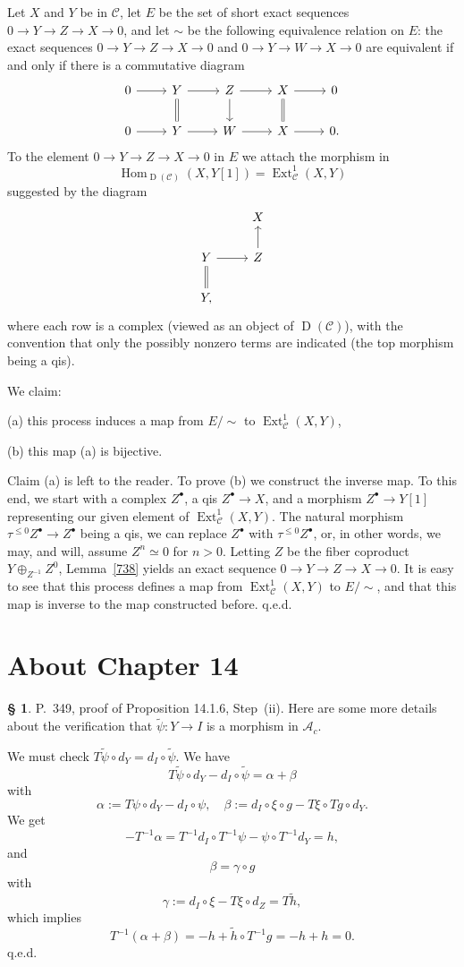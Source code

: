 \documentclass[12pt]{article}%
\theoremstyle{remark}
\theoremstyle{definition}
\newtheorem{s}[thm]{\S}%
\newcommand{\oo}{\operatorname}
\newcommand{\A}{\mathcal A}
\newcommand{\C}{\mathcal C}
\DeclareMathOperator{\Hom}{Hom}%
\begin{document}
Let $X$ and $Y$ be in $\C$, let $E$ be the set of short exact sequences $0\to Y\to Z\to X\to0$, and let $\sim$ be the following equivalence relation on $E$: the exact sequences $0\to Y\to Z\to X\to0$ and $0\to Y\to W\to X\to0$ are equivalent if and only if there is a commutative diagram 
$$
\begin{tikzcd}
0\ar{r}&Y\ar[equal]{d}\ar{r}&Z\ar{d}\ar{r}&X\ar[equal]{d}\ar{r}&0\\ 
0\ar{r}&Y\ar{r}&W\ar{r}&X\ar{r}&0.
\end{tikzcd}
$$ 
To the element $0\to Y\to Z\to X\to0$ in $E$ we attach the morphism in 
$$
\Hom_{\oo D(\C)}(X,Y[1])=\oo{Ext}^1_\C(X,Y)
$$ 
suggested by the diagram 
$$
\begin{tikzcd}
{}&X\\ 
Y\ar[equal]{d}\ar{r}&Z\ar{u}\\ 
Y,
\end{tikzcd}
$$ 
where each row is a complex (viewed as an object of $\oo D(\C)$), with the convention that only the possibly nonzero terms are indicated (the top morphism being a qis). 

We claim: 

(a) this process induces a map from $E/\!\!\sim$ to $\oo{Ext}^1_\C(X,Y)$, 

(b) this map (a) is bijective. 

Claim (a) is left to the reader. To prove (b) we construct the inverse map. To this end, we start with a complex $Z^\bullet$, a qis $Z^\bullet\to X$, and a morphism $Z^\bullet\to Y[1]$ representing our given element of $\oo{Ext}^1_\C(X,Y)$. The natural morphism $\tau^{\le0}Z^\bullet\to Z^\bullet$ being a qis, we can replace $Z^\bullet$ with $\tau^{\le0}Z^\bullet$, or, in other words, we may, and will, assume $Z^n\simeq0$ for $n>0$. Letting $Z$ be the fiber coproduct $Y\oplus_{Z^{-1}}Z^0$, Lemma~\ref{738} yields an exact sequence $0\to Y\to Z\to X\to0$. It is easy to see that this process defines a map from $\oo{Ext}^1_\C(X,Y)$ to $E/\!\!\sim$, and that this map is inverse to the map constructed before. q.e.d.


\section{About Chapter 14}

\begin{s} 
P.~349, proof of Proposition 14.1.6, Step~(ii). Here are some more details about the verification that $\widetilde\psi:Y\to I$ is a morphism in $\A_c$. 

We must check $T\widetilde\psi\circ d_Y=d_I\circ\widetilde\psi$. We have 
$$
T\widetilde\psi\circ d_Y-d_I\circ\widetilde\psi=\alpha+\beta
$$
with
$$
\alpha:=T\psi\circ d_Y-d_I\circ\psi,\quad\beta :=d_I\circ\xi\circ g-T\xi\circ Tg\circ d_Y.
$$ 
We get 
$$
-T^{-1}\alpha=T^{-1}d_I\circ T^{-1}\psi-\psi\circ T^{-1}d_Y=h,
$$ 
and 
$$
\beta=\gamma\circ g
$$ 
with 
$$
\gamma:=d_I\circ\xi-T\xi\circ d_Z=T\widetilde h,
$$ 
which implies 
$$
T^{-1}(\alpha+\beta)=-h+\widetilde h\circ T^{-1}g=-h+h=0.
$$
q.e.d.
\end{s}
\end{document}
